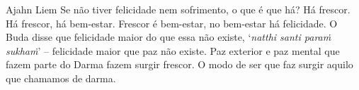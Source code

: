 
\begin{quotepage}{0.52\linewidth}{Ajahn Liem}
Se não tiver felicidade nem sofrimento, o que é que há? Há frescor. Há
frescor, há bem-estar. Frescor é bem-estar, no bem-estar há felicidade.
O Buda disse que felicidade maior do que essa não existe,
‘\emph{natthi santi paraṁ sukhaṁ}’ – felicidade maior que
paz não existe. Paz exterior e paz mental que fazem parte do Darma
fazem surgir frescor. O modo de ser que faz surgir aquilo que chamamos de darma.
\end{quotepage}

